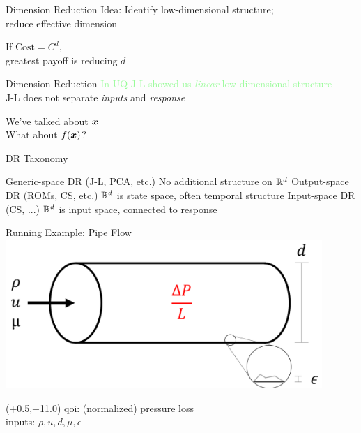 \documentclass[14pt]{beamer}
\begin{document}

\begin{frame}{Dimension Reduction}
  Idea: Identify low-dimensional structure; \\
  reduce effective dimension

  \bigskip If $\text{Cost} = C^d$, \\
  greatest payoff is reducing $d$
\end{frame}

\begin{frame}{Dimension Reduction \textcolor{palegreen}{In UQ}}
  \bigskip \textcolor{palegreen}{J-L showed us \emph{linear} low-dimensional structure} \\
  \textcolor{palered}{J-L does not separate \emph{inputs} and \emph{response}}

  \bigskip We've talked about $\boldsymbol{x}$ \\
  What about $f(\boldsymbol{x})$?
\end{frame}

\begin{frame}{DR Taxonomy}
  \begin{outline}
  \1 Generic-space DR (J-L, PCA, etc.)
    \2 No additional structure on $\mathbb{R}^{d}$
  \1 Output-space DR (ROMs, CS, etc.)
    \2 $\mathbb{R}^{d}$ is state space, often temporal structure
  \1 \alert<2>{Input-space DR} (CS, ...)
    \2 $\mathbb{R}^{d}$ is input space, connected to response
  \end{outline}
\end{frame}

\begin{frame}{Running Example: Pipe Flow}
  \centering
  \includegraphics[width=0.9\textwidth]{../images/pipe_diagram}

  \begin{textblock}{6.0}(+0.5,+11.0)
      {\textblockcolor{}
        qoi: (normalized) pressure loss \\
        inputs: $\rho, u, d, \mu, \epsilon$
      }
  \end{textblock}
\end{frame}
\end{document}
